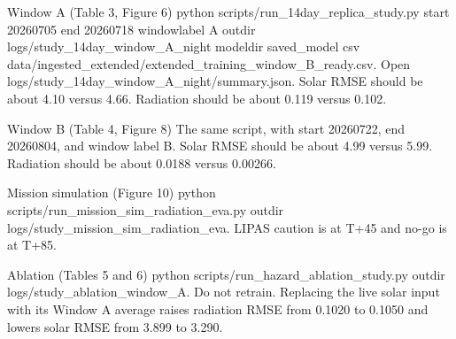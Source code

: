 Window A (Table 3, Figure 6) python scripts/run\_14day\_replica\_study.py start 20260705 end 20260718 windowlabel A outdir logs/study\_14day\_window\_A\_night modeldir saved\_model csv data/ingested\_extended/extended\_training\_window\_B\_ready.csv. Open logs/study\_14day\_window\_A\_night/summary.json. Solar RMSE should be about 4.10 versus 4.66. Radiation should be about 0.119 versus 0.102.

Window B (Table 4, Figure 8) The same script, with start 20260722, end 20260804, and window label B. Solar RMSE should be about 4.99 versus 5.99. Radiation should be about 0.0188 versus 0.00266.

Mission simulation (Figure 10) python scripts/run\_mission\_sim\_radiation\_eva.py outdir logs/study\_mission\_sim\_radiation\_eva. LIPAS caution is at T+45 and no-go is at T+85.

Ablation (Tables 5 and 6) python scripts/run\_hazard\_ablation\_study.py outdir logs/study\_ablation\_window\_A. Do not retrain. Replacing the live solar input with its Window A average raises radiation RMSE from 0.1020 to 0.1050 and lowers solar RMSE from 3.899 to 3.290.
